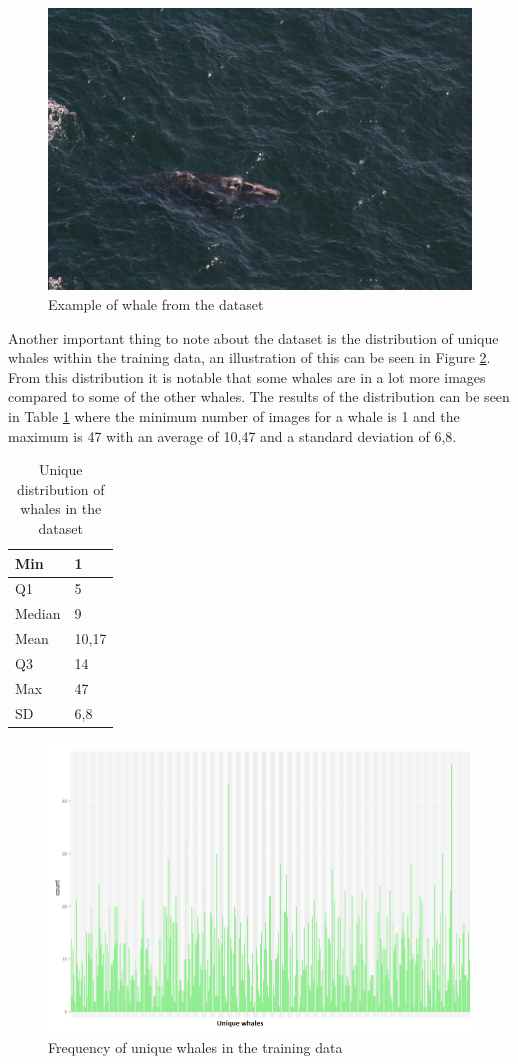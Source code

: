 \begin{figure}
	\centering
	\includegraphics[width=\linewidth]{Images/w_7489}
	\caption{Example of whale from the dataset}
	\label{fig:whale-example}
\end{figure}

Another important thing to note about the dataset is the distribution of unique whales within the training data, an illustration of this can be seen in Figure \ref{fig:whale-frequency}. From this distribution it is notable that some whales are in a lot more images compared to some of the other whales. The results of the distribution can be seen in Table \ref{table:whale-distribution} where the minimum number of images for a whale is 1 and the maximum is 47 with an average of 10,47 and a standard deviation of 6,8.

\begin{table}
	\centering
	\caption{Unique distribution of whales in the dataset}
	\label{table:whale-distribution}
	\begin{tabularx}{\linewidth}{|X|X|}
		\hline
		Min    & 1     \\ \hline
		Q1     & 5     \\ \hline
		Median & 9     \\ \hline
		Mean   & 10,17 \\ \hline
		Q3     & 14    \\ \hline
		Max    & 47    \\ \hline
		SD     & 6,8   \\ \hline
	\end{tabularx}
\end{table}

\begin{figure}
	\centering
	\includegraphics[width=\linewidth]{Images/FrequencyPlot}
	\caption{Frequency of unique whales in the training data}
	\label{fig:whale-frequency}
\end{figure}	